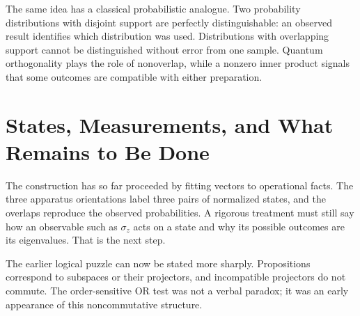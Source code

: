 \begin{classroomqa}
\end{classroomqa}

The same idea has a classical probabilistic analogue. Two probability distributions with disjoint support are perfectly distinguishable: an observed result identifies which distribution was used. Distributions with overlapping support cannot be distinguished without error from one sample. Quantum orthogonality plays the role of nonoverlap, while a nonzero inner product signals that some outcomes are compatible with either preparation.

\begin{classroomqa}
\end{classroomqa}

\section{States, Measurements, and What Remains to Be Done}

The construction has so far proceeded by fitting vectors to operational facts. The three apparatus orientations label three pairs of normalized states, and the overlaps reproduce the observed probabilities. A rigorous treatment must still say how an observable such as \(\sigma_z\) acts on a state and why its possible outcomes are its eigenvalues. That is the next step.

The earlier logical puzzle can now be stated more sharply. Propositions correspond to subspaces or their projectors, and incompatible projectors do not commute. The order-sensitive OR test was not a verbal paradox; it was an early appearance of this noncommutative structure.

